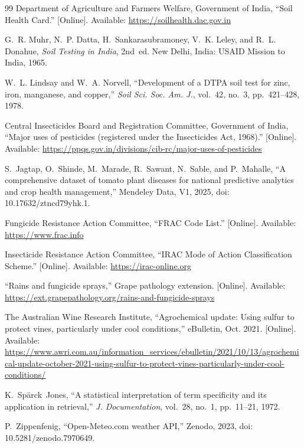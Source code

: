 \documentclass[conference]{IEEEtran}
\begin{document}
\begin{thebibliography}{99}
Department of Agriculture and Farmers Welfare, Government of India, ``Soil Health Card.'' [Online]. Available: \url{https://soilhealth.dac.gov.in}

G.~R. Muhr, N.~P. Datta, H.~Sankarasubramoney, V.~K. Leley, and R.~L. Donahue, \emph{Soil Testing in India}, 2nd~ed. New Delhi, India: USAID Mission to India, 1965.

W.~L. Lindsay and W.~A. Norvell, ``Development of a DTPA soil test for zinc, iron, manganese, and copper,'' \emph{Soil Sci. Soc. Am. J.}, vol.~42, no.~3, pp.~421--428, 1978.

Central Insecticides Board and Registration Committee, Government of India, ``Major uses of pesticides (registered under the Insecticides Act, 1968).'' [Online]. Available: \url{https://ppqs.gov.in/divisions/cib-rc/major-uses-of-pesticides}

S.~Jagtap, O.~Shinde, M.~Marade, R.~Sawant, N.~Sable, and P.~Mahalle, ``A comprehensive dataset of tomato plant diseases for national predictive analytics and crop health management,'' Mendeley Data, V1, 2025, doi: 10.17632/ztncd79yhk.1.

Fungicide Resistance Action Committee, ``FRAC Code List.'' [Online]. Available: \url{https://www.frac.info}

Insecticide Resistance Action Committee, ``IRAC Mode of Action Classification Scheme.'' [Online]. Available: \url{https://irac-online.org}

``Rains and fungicide sprays,'' Grape pathology extension. [Online]. Available: \url{https://ext.grapepathology.org/rains-and-fungicide-sprays}

The Australian Wine Research Institute, ``Agrochemical update: Using sulfur to protect vines, particularly under cool conditions,'' eBulletin, Oct. 2021. [Online]. Available: \url{https://www.awri.com.au/information_services/ebulletin/2021/10/13/agrochemical-update-october-2021-using-sulfur-to-protect-vines-particularly-under-cool-conditions/}

K.~Sp\"{a}rck~Jones, ``A statistical interpretation of term specificity and its application in retrieval,'' \emph{J. Documentation}, vol.~28, no.~1, pp.~11--21, 1972.

P.~Zippenfenig, ``Open-Meteo.com weather API,'' Zenodo, 2023, doi: 10.5281/zenodo.7970649.


\end{thebibliography}
\end{document}
